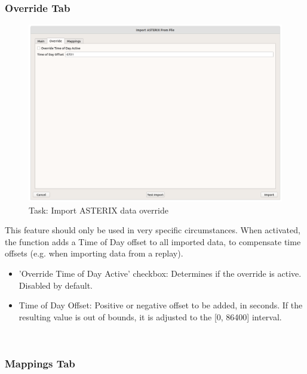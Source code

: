 \subsubsection{Override Tab}
\label{sec:task_import_asterix_override}


\begin{figure}[H]
  \center
    \hspace*{-0.5cm}
    \includegraphics[width=17cm]{figures/asterix_import_data_override.png}
  \caption{Task: Import ASTERIX data override}
\end{figure}

This feature should only be used in very specific circumstances. When activated, the function adds a Time of Day offset to all imported data, to compensate time offsets (e.g. when importing data from a replay). \\

\begin{itemize}
\item 'Override Time of Day Active' checkbox: Determines if the override is active. Disabled by default.
\item Time of Day Offset: Positive or negative offset to be added, in seconds. If the resulting value is out of bounds, it is adjusted to the [0, 86400] interval.
\end{itemize}
\ \\

\subsubsection{Mappings Tab}

